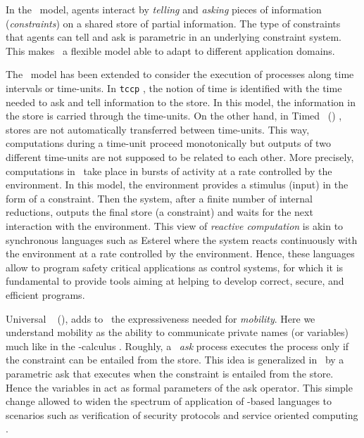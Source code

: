 \documentclass{tlp}
\begin{document}
In the \ccp\ model,
agents interact by \emph{telling} and \emph{asking} pieces of
information (\emph{constraints}) on a shared store of partial information.
The type of constraints that  agents can tell and ask is  parametric in an underlying constraint system. This makes \ccp\ a flexible model able to adapt to different application domains.

The \ccp\ model has been extended to consider the execution of processes along  time intervals or time-units. In  \texttt{tccp} \cite{bgm99}, 
 the notion of time is identified with the time needed to ask and tell information to the  store. In this model, the information in the store is carried through the time-units. On the other hand, in Timed \ccp\ (\tccp) \cite{tcc-lics94},
 stores are not automatically transferred between time-units. This way,  computations during a time-unit proceed 
monotonically but outputs of two different time-units are 
not supposed to be related to each other.
 More precisely, computations in \tccp\ take place in bursts of activity at a rate controlled by the environment. In this model,  the environment provides a stimulus (input) in the form of  a constraint. Then the system, after a finite 
number of internal reductions,  outputs the final store (a constraint) and  waits for the next interaction 
with the environment.  This view of \emph{reactive computation} is 
akin to synchronous languages such as Esterel \cite{BeGo92}  where the system 
reacts continuously 
with the environment at a rate controlled by the environment.  
Hence, these languages allow to program safety critical applications as control systems, 
for which it is fundamental to provide tools aiming at helping  to 
develop correct, secure, and efficient programs.

Universal \tccp\  \cite{Olarte:08:SAC}  (\utcc), adds to \tccp\ the expressiveness needed for \emph{mobility}. Here we understand mobility as the ability to communicate private names (or variables) much like in the -calculus \cite{milner.parrow.ea:calculus-mobile}. Roughly, a \tccp\ \emph{ask} process  executes the process  only if the constraint   can be entailed from the store. This idea is generalized in \utcc\ by  a parametric ask that executes  when the constraint  is entailed from the store. Hence the variables in  act as formal parameters of the ask operator. This simple change allowed to widen  the spectrum of application of \ccp-based languages to scenarios such as verification of security protocols \cite{Olarte:08:SAC} and service oriented computing \cite{Lopez-Places09}.
\end{document}
